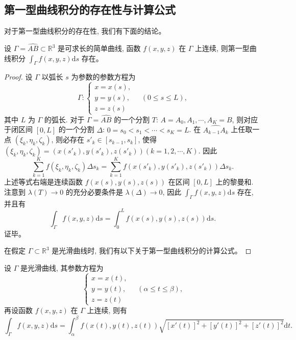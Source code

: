 \documentclass[UTF8,12pt,a4paper,fontset=fandol]{ctexart}
\begin{document}
\subsection{第一型曲线积分的存在性与计算公式}

对于第一型曲线积分的存在性, 我们有下面的结论。

\begin{theorem}\label{course-theorem-16-1-1}\quad 设 $\Gamma=\widehat{AB}\subset\mathbb R^3$ 是可求长的简单曲线, 函数 $f(x,y,z)$ 在 $\Gamma$ 上连续, 则第一型曲线积分 $\int_\Gamma f(x,y,z)\mathrm ds$ 存在。

\end{theorem}
\begin{proof}\quad 设 $\Gamma$ 以弧长 $s$ 为参数的参数方程为
\[
  \Gamma:
  \begin{cases}
    x=x(s),\\
    y=y(s),\\
    z=z(s)
  \end{cases}
  \quad(0\leqslant s\leqslant L),
\]
其中 $L$ 为 $\Gamma$ 的弧长. 对于 $\Gamma=\widehat{AB}$ 的一个分割 $T$: $A=A_0,A_1,\cdots,A_K=B$, 则对应于闭区间 $[0,L]$ 的一个分割 $\Delta$: $0=s_0<s_1<\cdots<s_K=L$. 在 $\widehat{A_{k-1}A_k}$ 上任取一点 $(\xi_k,\eta_k,\zeta_k)$, 则必存在 $s'_k\in[s_{k-1},s_k]$, 使得 $(\xi_k,\eta_k,\zeta_k)=(x(s'_k),y(s'_k),z(s'_k))(k=1,2,\cdots,K)$. 因此
\[
  \sum_{k=1}^K f(\xi_k,\eta_k,\zeta_k)\Delta s_k
  =\sum_{k=1}^K f(x(s'_k),y(s'_k),z(s'_k))\Delta s_k.
\]
上述等式右端是连续函数 $f(x(s),y(s),z(s))$ 在区间 $[0,L]$ 上的黎曼和. 注意到 $\lambda(T)\to0$ 的充分必要条件是 $\lambda(\Delta)\to0$, 因此 $\int_\Gamma f(x,y,z)\mathrm ds$ 存在, 并且有
\[
  \int_\Gamma f(x,y,z)\mathrm ds=\int_0^L f(x(s),y(s),z(s))\mathrm ds.
\]
证毕。

在假定 $\Gamma\subset\mathbb R^3$ 是光滑曲线时, 我们有以下关于第一型曲线积分的计算公式。

\end{proof}
\begin{theorem}\label{course-theorem-16-1-2}\quad 设 $\Gamma$ 是光滑曲线, 其参数方程为
\[
  \begin{cases}
    x=x(t),\\
    y=y(t),\\
    z=z(t)
  \end{cases}
  \quad(\alpha\leqslant t\leqslant \beta),
\]
再设函数 $f(x,y,z)$ 在 $\Gamma$ 上连续, 则有
\[
  \int_\Gamma f(x,y,z)\mathrm ds
  =\int_\alpha^\beta f(x(t),y(t),z(t))
  \sqrt{[x'(t)]^2+[y'(t)]^2+[z'(t)]^2}\mathrm dt.
\]

\end{theorem}
\end{document}
